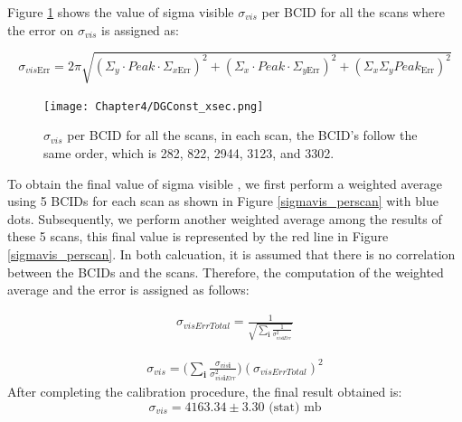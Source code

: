 Figure \ref{sigmavis_perbcid} shows the  value of sigma visible $\sigma_{vis}$ per BCID for all the scans where the error on $\sigma_{vis}$ is assigned as: 

\begin{equation}
\sigma_{vis\text{Err}}= 2 \pi \sqrt{ (\Sigma_{y} \cdot Peak \cdot \Sigma_{x\text{Err}})^{2} + (\Sigma_{x} \cdot Peak \cdot \Sigma_{y \text{Err}})^{2} + (\Sigma_{x} \Sigma_{y} Peak_{\text{Err}})^{2} }
\end{equation}

\begin{center}
  \begin{figure}[h!]
    \centering
    \texttt{[image: Chapter4/DGConst\_xsec.png]}
    \caption[$\sigma_{vis}$ per BCID for all scans]{ $\sigma_{vis}$ per BCID for all the scans,  in each scan, the BCID's follow the same order, which is 282, 822, 2944, 3123, and 3302.}
    \label{sigmavis_perbcid}
  \end{figure}
\end{center}

To obtain the final value of sigma visible , we first perform a weighted average using 5 BCIDs for each scan as shown in Figure \ref{sigmavis_perscan} with blue dots. Subsequently, we perform another weighted average among the results of these 5 scans, this final value is represented by the red line in Figure \ref{sigmavis_perscan}. In both calcuation, it is assumed that there is no correlation between the BCIDs and the scans. Therefore, the computation of the weighted average and the error is assigned as follows:

\begin{eqnarray}
\sigma_{visErrTotal}=\frac{1}{\sqrt{ \displaystyle\sum_{\textbf{i}} \frac{1}{\sigma_{vis\textbf{i}Err}^{2}}}}
\label{error}
\end{eqnarray}

\begin{eqnarray}
\sigma_{vis}=\Biggl(\displaystyle\sum_{\textbf{i}} \frac{\sigma_{vis\textbf{i}}}{\sigma^{2}_{vis\textbf{i}Err}} \Biggr)(\sigma_{visErrTotal})^{2}
\label{average}
\end{eqnarray}
After completing the calibration procedure, the final result obtained is:
\begin{equation}
\sigma_{vis}=4163.34 \pm 3.30 \text{ (stat)  mb}
\end{equation}

